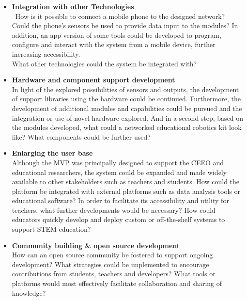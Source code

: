 \begin{itemize}
    \item \textbf{Integration with other Technologies}\\\
    How is it possible to connect a mobile phone to the designed network? Could the phone's sensors be used to provide data input to the modules? In addition, an app version of some tools could be developed to program, configure and interact with the system from a mobile device, further increasing accessibility.\\
    What other technologies could the system be integrated with?
    
    \item \textbf{Hardware and component support development}\\
    In light of the explored possibilities of sensors and outputs, the development of support libraries using the hardware could be continued. Furthermore, the development of additional modules and capabilities could be pursued and the integration or use of novel hardware explored.
    And in a second step, based on the modules developed, what could a networked educational robotics kit look like? What components could be further used? 
    
    \item \textbf{Enlarging the user base}\\
    Although the MVP was principally designed to support the CEEO and educational researchers, the system could be expanded and made widely available to other stakeholders such as teachers and students. How could the platform be integrated with external platforms such as data analysis tools or educational software? In order to facilitate its accessibility and utility for teachers, what further developments would be necessary? How could educators quickly develop and deploy custom or off-the-shelf systems to support STEM education?
    
    \item \textbf{Community building \& open source development}\\
    How can an open source community be fostered to support ongoing development? What strategies could be implemented to encourage contributions from students, teachers and developers? What tools or platforms would most effectively facilitate collaboration and sharing of knowledge? 
\end{itemize}


